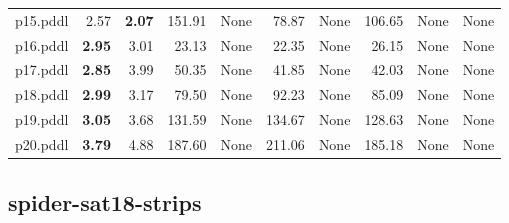\documentclass{article}
\begin{document}
\begin{tabular}{@{}lrrrrrrrrr@{}}
p15.pddl & 2.57 & \textbf{2.07} & 151.91 & \multicolumn{1}{|l|}{None} & 78.87 & \multicolumn{1}{|l|}{None} & 106.65 & \multicolumn{1}{|l|}{None} & \multicolumn{1}{|l|}{None} \\
p16.pddl & \textbf{2.95} & 3.01 & 23.13 & \multicolumn{1}{|l|}{None} & 22.35 & \multicolumn{1}{|l|}{None} & 26.15 & \multicolumn{1}{|l|}{None} & \multicolumn{1}{|l|}{None} \\
p17.pddl & \textbf{2.85} & 3.99 & 50.35 & \multicolumn{1}{|l|}{None} & 41.85 & \multicolumn{1}{|l|}{None} & 42.03 & \multicolumn{1}{|l|}{None} & \multicolumn{1}{|l|}{None} \\
p18.pddl & \textbf{2.99} & 3.17 & 79.50 & \multicolumn{1}{|l|}{None} & 92.23 & \multicolumn{1}{|l|}{None} & 85.09 & \multicolumn{1}{|l|}{None} & \multicolumn{1}{|l|}{None} \\
p19.pddl & \textbf{3.05} & 3.68 & 131.59 & \multicolumn{1}{|l|}{None} & 134.67 & \multicolumn{1}{|l|}{None} & 128.63 & \multicolumn{1}{|l|}{None} & \multicolumn{1}{|l|}{None} \\
p20.pddl & \textbf{3.79} & 4.88 & 187.60 & \multicolumn{1}{|l|}{None} & 211.06 & \multicolumn{1}{|l|}{None} & 185.18 & \multicolumn{1}{|l|}{None} & \multicolumn{1}{|l|}{None} \\
\end{tabular}

\hypertarget{search_start_time-spider-sat18-strips}{}
\subsection*{spider-sat18-strips}
\end{document}
